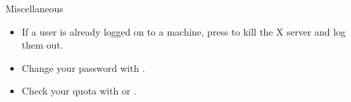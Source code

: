 \begin{block}{Miscellaneous}
  \begin{itemize}
  \item If a user is already logged on to a machine, press  to kill the X server and log them out.
  \item Change your password with .
  \item Check your quota with  or .
  \end{itemize}
\end{block}
